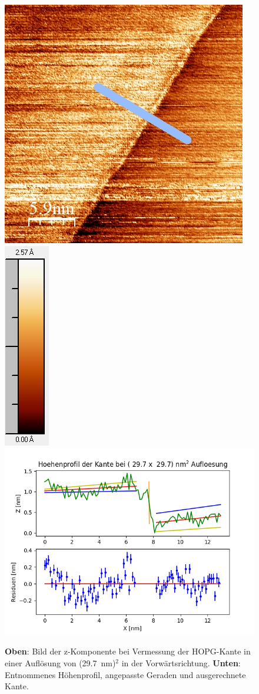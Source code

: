 \documentclass[12pt,a4paper]{article}
\begin{document}
\begin{figure}[H]
\centering
\includegraphics[scale=0.6]{Bilder/Anhang/Kante/0297_Kante_vor.jpg}
\includegraphics[scale=0.7]{Bilder/Anhang/Kante/0297_Kante_vor_Skala.jpg}
\includegraphics[scale=0.55]{Bilder/Anhang/Kante/Profil_Kante_0297_vor.png}
\caption{\textbf{Oben}: Bild der z-Komponente bei Vermessung der HOPG-Kante in einer Auflösung von (\SI{29,7}{nm})$^2$ in der Vorwärtsrichtung. \textbf{Unten}: Entnommenes Höhenprofil, angepasste Geraden und ausgerechnete Kante.}
\end{figure}
\end{document}
